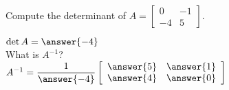 \documentclass{ximera}
\begin{document}
  	 \begin{question}Compute the determinant of $A=\begin{bmatrix} 0& -1\\ -4&5 \end{bmatrix}$.
  		 	
  		 	$ \det A = \answer{-4}$\\
  	
  		What is $A^{-1}$?\\
  		
  		$A^{-1} = \dfrac{1}{\answer{-4}} \left[ \begin{array}{cc} \answer{5} &\answer{1} \\ \answer{4} &\answer{0} \end{array}\right]$
  		
  		\end{question}
  
\end{document}
